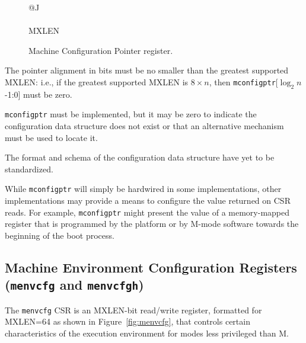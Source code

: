\begin{figure}[h!]
{\footnotesize
\begin{center}
\begin{tabular}{@{}J}
 \\
\hline
{} \\
\hline
MXLEN \\
\end{tabular}
\end{center}
}
\vspace{-0.1in}
\caption{Machine Configuration Pointer register.}
\label{mconfigptrreg}
\end{figure}

The pointer alignment in bits must be no smaller than the greatest supported
MXLEN: i.e., if the greatest supported MXLEN is $8\times n$, then
{\tt mconfigptr}[$\log_2n$-1:0] must be zero.

{\tt mconfigptr} must be implemented, but it may be zero to
indicate the configuration data structure does not exist or that an
alternative mechanism must be used to locate it.

\begin{commentary}
The format and schema of the configuration data structure have yet to be standardized.
\end{commentary}

\begin{commentary}
While {\tt mconfigptr} will simply be hardwired in some implementations, other
implementations may provide a means to configure the value returned on CSR
reads.
For example, {\tt mconfigptr} might present the value of a memory-mapped
register that is programmed by the platform or by M-mode software towards the
beginning of the boot process.
\end{commentary}

\subsection{%
 Machine Environment Configuration Registers
 ({\tt menvcfg} and {\tt menvcfgh})%
}

The {\tt menvcfg} CSR is an MXLEN-bit read/write register,
formatted for MXLEN=64 as shown in Figure~\ref{fig:menvcfg},
that controls certain characteristics of the execution environment
for modes less privileged than M.

